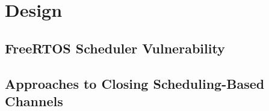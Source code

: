 \section{Design}
\label{sec:design}


\subsection{FreeRTOS Scheduler Vulnerability}
\label{sub:vulnerability}


\subsection{Approaches to Closing Scheduling-Based Channels}
\label{sub:approaches}



